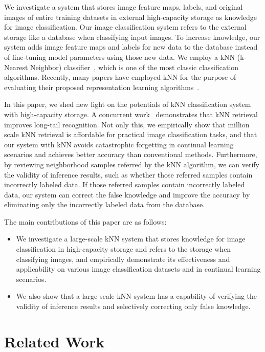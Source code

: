 \documentclass[runningheads]{llncs}
\begin{document}
We investigate a system that stores image feature maps, labels, and original images of entire training datasets in external high-capacity storage as knowledge for image classification.
Our image classification system refers to the external storage like a database when classifying input images.
To increase knowledge, our system adds image feature maps and labels for new data to the database instead of fine-tuning model parameters using those new data. 
We employ a kNN (k-Nearest Neighbor) classifier~\cite{kNNreview}, which is one of the most classic classification algorithms.
Recently, many papers have employed kNN for the purpose of evaluating their proposed representation learning algorithms~\cite{DINO,iBOT,EsViT}.

In this paper, we shed new light on the potentials of kNN classification system with high-capacity storage.
A concurrent work~\cite{longtail_retrieval} demonstrates that kNN retrieval improves long-tail recognition.
Not only this, we empirically show that million scale kNN retrieval is affordable for practical image classification tasks,
and that our system with kNN avoids catastrophic forgetting in continual learning scenarios and achieves better accuracy than conventional methods.
Furthermore, by reviewing neighborhood samples referred by the kNN algorithm, we can verify the validity of inference results,
such as whether those referred samples contain incorrectly labeled data.
If those referred samples contain incorrectly labeled data,
our system can correct the false knowledge and improve the accuracy by eliminating only the incorrectly labeled data from the database.

The main contributions of this paper are as follows:
\begin{itemize}
\item We investigate a large-scale kNN system that stores knowledge for image classification in high-capacity storage and refers to the storage when classifying images, and empirically demonstrate its effectiveness and applicability on various image classification datasets and in continual learning scenarios.
\item We also show that a large-scale kNN system has a capability of verifying the validity of inference results and selectively correcting only false knowledge.
\end{itemize}


\section{Related Work}
\label{sec:related_works}
\end{document}

